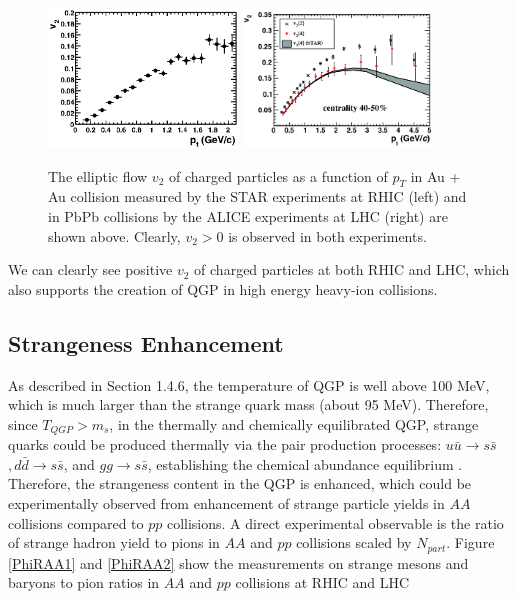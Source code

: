 \begin{figure}[hbtp]
\begin{center}
\includegraphics[width=0.45\textwidth]{Figures/Chapter1/STARV2Plot.eps}
\includegraphics[width=0.45\textwidth]{Figures/Chapter1/ALICEV2Plot.png}
\caption{The elliptic flow $v_2$ of charged particles as a function of $p_T$ in Au + Au collision measured by the STAR experiments at RHIC (left) and in PbPb collisions by the ALICE experiments at LHC (right) are shown above. Clearly, $v_2 > 0$ is observed in both experiments.}
\label{V2}
\end{center}
\end{figure}   

We can clearly see positive $v_2$ of charged particles at both RHIC and LHC, which also supports the creation of QGP in high energy heavy-ion collisions.  
 
\subsection{Strangeness Enhancement} 

As described in Section 1.4.6, the temperature of QGP is well above 100 MeV, which is much larger than the strange quark mass (about 95 MeV). Therefore, since $T_{QGP} > m_s$, in the thermally and chemically equilibrated QGP, strange quarks could be produced thermally via the pair production processes: $u \bar u \rightarrow s\bar s$$, d \bar d \rightarrow s\bar s$, and $gg \rightarrow s \bar s$, establishing the chemical abundance equilibrium \cite{SSEnhance}. Therefore, the strangeness content in the QGP is enhanced, which could be experimentally observed from enhancement of strange particle yields in $AA$ collisions compared to $pp$ collisions. A direct experimental observable is the ratio of strange hadron yield to pions in $AA$ and $pp$ collisions scaled by $N_{part}$. Figure \ref{PhiRAA1} and \ref{PhiRAA2} show the measurements on strange mesons and baryons to pion ratios in $AA$ and $pp$ collisions at RHIC \cite{StrangeSTAR} and LHC \cite{StrangeALICE} 

